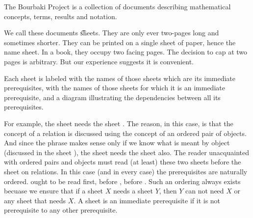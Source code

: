 
The Bourbaki Project is a collection of documents describing mathematical concepts, terms, results and notation.


We call these documents \t{sheets}.
They are only ever two-pages long and sometimes shorter.
They can be printed on a single sheet of paper, hence the name sheet.
In a book, they occupy two facing pages.
The decision to cap at two pages is arbitrary.
But our experience suggests it is convenient.



Each sheet is labeled with the names of those sheets which are its immediate prerequisites, with the names of those sheets for which it is an immediate prerequisite, and a diagram illustrating the dependencies between all its prerequisites.

For example, the sheet  needs the sheet .
The reason, in this case, is that the concept of a relation is discussed using the concept of an ordered pair of objects.
And since the phrase  makes sense only if we know what is meant by object (discussed in the sheet ), the sheet  needs the sheet  also.
The reader unacquainted with ordered pairs and objects must read (at least) these two sheets before the sheet on relations.
In this case (and in every case) the prerequisites are naturally ordered.
 ought to be read first, before , before .
Such an ordering always exists becuase we ensure that if a sheet $X$ needs a sheet $Y$, then $Y$ can not need $X$ or any sheet that needs $X$.
A sheet is an immediate prerequisite if it is not prerequisite to any other prerequisite.

